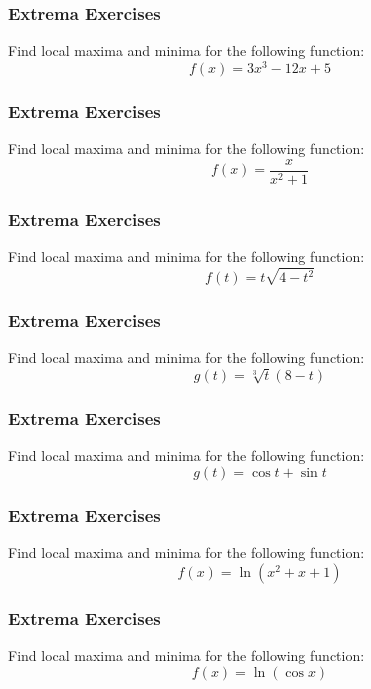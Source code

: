 \documentclass[xcolor=dvipsnames]{beamer}
\begin{document}
\begin{frame}
  \frametitle{Extrema Exercises}
{\ubung} Find local maxima and minima for the following function:
\begin{equation}
  \label{eq:xxyxx1}
f(x)=3x^{3}-12x+5
\end{equation}
\end{frame}

\begin{frame}
  \frametitle{Extrema Exercises}
{\ubung} Find local maxima and minima for the following function:
\begin{equation}
  \label{eq:xxyxx2}
f(x)=\frac{x}{x^{2}+1}
\end{equation}
\end{frame}

\begin{frame}
  \frametitle{Extrema Exercises}
{\ubung} Find local maxima and minima for the following function:
\begin{equation}
  \label{eq:xxyxx3}
f(t)=t\sqrt{4-t^{2}}
\end{equation}
\end{frame}

\begin{frame}
  \frametitle{Extrema Exercises}
{\ubung} Find local maxima and minima for the following function:
\begin{equation}
  \label{eq:xxyxx4}
g(t)=\sqrt[3]{t}(8-t)
\end{equation}
\end{frame}

\begin{frame}
  \frametitle{Extrema Exercises}
{\ubung} Find local maxima and minima for the following function:
\begin{equation}
  \label{eq:xxyxx4}
g(t)=\cos{}t+\sin{}t
\end{equation}
\end{frame}

\begin{frame}
  \frametitle{Extrema Exercises}
{\ubung} Find local maxima and minima for the following function:
\begin{equation}
  \label{eq:xxyxx5}
f(x)=\ln(x^{2}+x+1)
\end{equation}
\end{frame}

\begin{frame}
  \frametitle{Extrema Exercises}
{\ubung} Find local maxima and minima for the following function:
\begin{equation}
  \label{eq:xxyxx5}
f(x)=\ln\left(\cos{}x\right)
\end{equation}
\end{frame}
\end{document}
